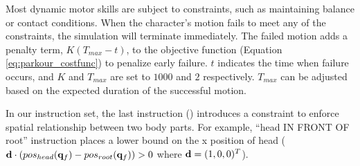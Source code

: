  



Most dynamic motor skills are subject to constraints, such as maintaining
balance or contact conditions.  When the character's motion fails to
meet any of the constraints, the simulation will terminate
immediately. The failed motion adds a penalty term, $K (T_{max} - t)
$, to the objective function (Equation \ref{eq:parkour_costfunc}) to penalize early
failure. $t$ indicates the time when failure occurs, and $K$ and
$T_{max}$ are set to $1000$ and $2$ respectively. $T_{max}$ can be
adjusted based on the expected duration of the successful motion.

In our instruction set, the last instruction ()
introduces a constraint to enforce spatial relationship between two
body parts. For example, ``head IN FRONT OF root'' instruction places a lower bound 
on the x position of head
($\mathbf{d} \cdot (pos_{head}(\mathbf{q}_f) - pos_{root}(\mathbf{q}_f)) > 0$ where $\mathbf{d}=(1,0,0)^T$).

